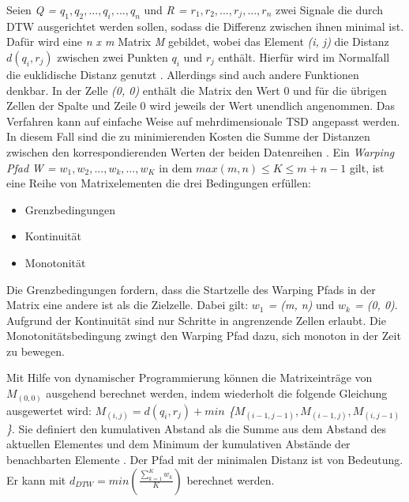Seien \emph{Q = $q_{1}, q_{2}, ... , q_{i}, ... , q_{n}$} und \emph{R = $r_{1}, r_{2}, ... , r_{j}, ... , r_{n}$}
zwei Signale die durch \ac{DTW} ausgerichtet werden sollen, sodass die Differenz zwischen ihnen minimal ist.
Dafür wird eine \emph{n x m} Matrix \emph{M} gebildet, wobei das Element \emph{(i, j)} die Distanz \emph{$d(q_{i}, r_{j})$}
zwischen zwei Punkten \emph{$q_{i}$} und \emph{$r_{j}$} enthält.
Hierfür wird im Normalfall die euklidische Distanz genutzt \citep{warren_liao_clustering_2005}.
Allerdings sind auch andere Funktionen denkbar.
In der Zelle \emph{(0, 0)} enthält die Matrix den Wert 0
und für die übrigen Zellen der Spalte und Zeile 0 wird jeweils der Wert unendlich angenommen.
Das Verfahren kann auf einfache Weise auf mehrdimensionale \ac{TSD} angepasst werden.
In diesem Fall sind die zu minimierenden Kosten die Summe
der Distanzen zwischen den korrespondierenden Werten der beiden Datenreihen \citep{mohammadzade_dynamic_2021}.
Ein \emph{Warping Pfad} \emph{W = $w_{1}, w_{2}, ... , w_{k}, ... , w_{K}$} in dem \emph{$max(m, n) \le K \le m + n - 1$} gilt,
ist eine Reihe von Matrixelementen die drei Bedingungen erfüllen:
\begin{itemize}
    \item Grenzbedingungen
    \item Kontinuität
    \item Monotonität
\end{itemize}
Die Grenzbedingungen fordern, dass die Startzelle des Warping Pfads in der Matrix eine andere ist als die Zielzelle.
Dabei gilt: \emph{$w_{1}$ = (m, n)} und \emph{$w_{k}$ = (0, 0)}.
Aufgrund der Kontinuität sind nur Schritte in angrenzende Zellen erlaubt.
Die Monotonitätsbedingung zwingt den Warping Pfad dazu, sich monoton in der Zeit zu bewegen.

Mit Hilfe von dynamischer Programmierung können die Matrixeinträge von \emph{$M_{(0, 0)}$} ausgehend berechnet werden,
indem wiederholt die folgende Gleichung ausgewertet wird:
\emph{$ M_{(i, j)} = d(q_{i}, r_{j}) + min $ \{$M_{(i - 1, j - 1)}, M_{(i - 1, j)}, M_{(i, j - 1)} $\}}.
Sie definiert den kumulativen Abstand als die Summe aus dem Abstand des aktuellen Elementes
und dem Minimum der kumulativen Abstände der benachbarten Elemente \citep{warren_liao_clustering_2005}.
Der Pfad mit der minimalen Distanz ist von Bedeutung.
Er kann mit \emph{$d_{DTW} = min(\frac{\sum_{k = 1}^{K}w_{k}}{K})$} berechnet werden.


